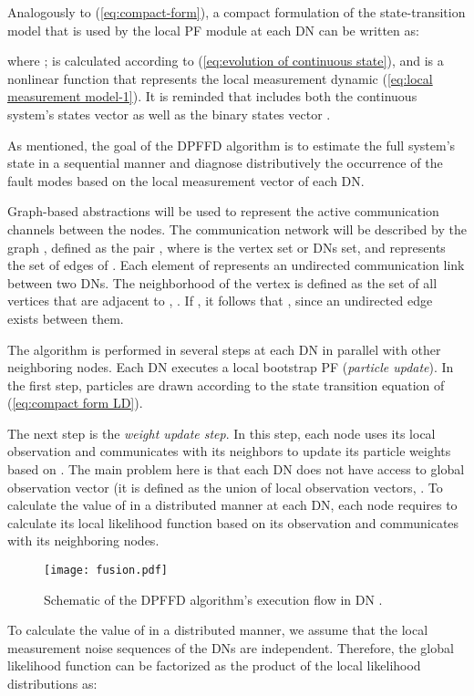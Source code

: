 \documentclass[10pt,twocolumn,twoside]{IEEEtran}
\begin{document}
Analogously to (\ref{eq:compact-form}), a compact formulation of
the state-transition model that is used by the local PF module at each
DN can be written as: 

\noindent where ;  is
calculated according to (\ref{eq:evolution of continuous state}),
and  is a nonlinear function that represents
the local measurement dynamic (\ref{eq:local measurement model-1}).
It is reminded that  includes both the continuous system's
states vector  as well as the binary states vector
. 

As mentioned, the goal of the DPFFD algorithm is to estimate the full
system's state  in a sequential manner and diagnose
distributively the occurrence of the fault modes based on the local
measurement vector of each DN. 

Graph-based abstractions will be used to represent the active communication channels between the nodes. The communication network will be described by the graph , defined as the pair , where  is the vertex set or DNs set, and  represents the set of edges of . Each element of  represents an undirected communication link between two DNs. The neighborhood  of the vertex  is defined as the set of all vertices that are adjacent to , . If , it follows that , since an undirected edge exists between them.

The algorithm is performed in several steps at each DN in parallel
with other neighboring nodes. Each DN executes a local bootstrap PF
(\emph{particle update}). In the first step,  particles are
drawn according to the state transition equation of (\ref{eq:compact form LD}). 

The next step is the \emph{weight update step}. In this step, each
node uses its local observation and communicates with its neighbors
to update its particle weights based on .
The main problem here is that each DN does not have access to global
observation vector (it is defined as the union of local observation
vectors, .
To calculate the value of 
in a distributed manner at each DN, each node requires to calculate
its local likelihood function 
based on its observation and communicates with its neighboring nodes.

\begin{figure}
\centering
\texttt{[image: fusion.pdf]}
\caption{Schematic of the DPFFD algorithm's execution flow in DN . \label{fig:Block-diagram-of}}
\end{figure}

To calculate the value of 
in a distributed manner, we assume that the local measurement noise
sequences of the DNs are independent. Therefore, the global likelihood
function can be factorized as the product of the local likelihood
distributions \cite{hlinka2013distributed,coates2004distributed,sheng2005distributed}
as: 
\end{document}
